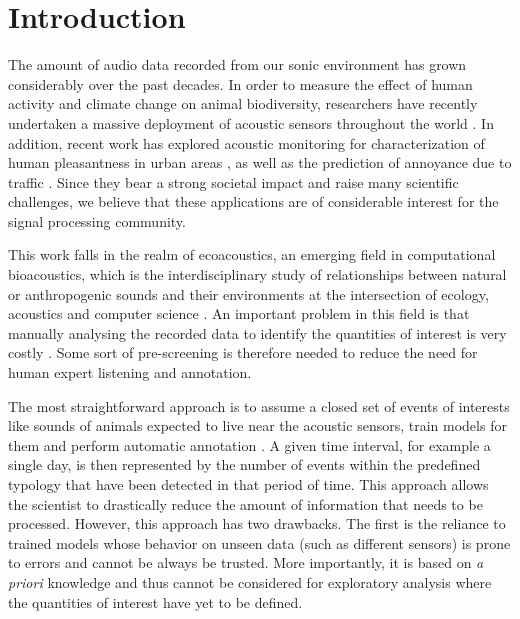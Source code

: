 \documentclass[smallextended]{svjour3}
\begin{document}
\section{Introduction}

The amount of audio data recorded from our sonic environment has grown considerably over the past decades.
In order to measure the effect of human activity and climate change on animal biodiversity, researchers have recently undertaken a massive deployment of acoustic sensors throughout the world \cite{warren2006urban, NessSST13, stowell13b}.
In addition, recent work has explored acoustic monitoring for characterization of human pleasantness in urban areas \cite{guyot2005urban, ricciardi2015sound}, as well as the prediction of annoyance due to traffic \cite{gloaguen}.
Since they bear a strong societal impact and raise many scientific challenges, we believe that these applications are of considerable interest for the signal processing community.

This work falls in the realm of ecoacoustics, an emerging field in computational bioacoustics, which is the interdisciplinary study of relationships between natural or anthropogenic sounds and their environments at the intersection of ecology, acoustics and computer science \cite{krause}. %
An important problem in this field is that manually analysing the recorded data to identify the quantities of interest is very costly \cite{wimmer2013sampling}. Some sort of pre-screening is therefore needed to reduce the need for human expert listening and annotation.

The most straightforward approach is to assume a closed set of events of interests like sounds of animals expected to live near the acoustic sensors, train models for them and perform automatic annotation \cite{}. A given time interval, for example a single day, is then represented by the number of events within the predefined typology that have been detected in that period of time. This approach allows the scientist to drastically reduce the amount of information that needs to be processed. However, this approach has two drawbacks. The first is the reliance to trained models whose behavior on unseen data (such as different sensors) is prone to errors and cannot be always be trusted. More importantly, it is based on \textit{a priori} knowledge and thus cannot be considered for exploratory analysis where the quantities of interest have yet to be defined.
\end{document}

